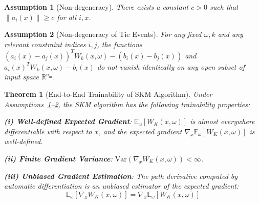 \documentclass[10pt,a4paper]{amsart}
\newtheorem{theorem}{Theorem}
\newtheorem{assumption}{Assumption}
\begin{document}
\begin{assumption}[Non-degeneracy]
\label{assump:nondeg}
There exists a constant $c > 0$ such that $\|a_i(x)\| \geq c$ for all $i,x$.
\end{assumption}

\begin{assumption}[Non-degeneracy of Tie Events]
\label{assump:tie}
For any fixed $\omega, k$ and any relevant constraint indices $i,j$, the functions $(a_i(x) - a_j(x))^T W_k(x,\omega) - (b_i(x) - b_j(x))$ and $a_i(x)^T W_k(x,\omega) - b_i(x)$ do not vanish identically on any open subset of input space $\mathbb{R}^{n_{\text{in}}}$.
\end{assumption}

\begin{theorem}[End-to-End Trainability of SKM Algorithm]
\label{thm:appendix-trainability}
Under Assumptions~\ref{assump:nondeg}--\ref{assump:tie}, the SKM algorithm has the following trainability properties:

\textbf{(i) Well-defined Expected Gradient}: $\mathbb{E}_\omega[W_K(x,\omega)]$ is almost everywhere differentiable with respect to $x$, and the expected gradient $\nabla_x \mathbb{E}_\omega[W_K(x,\omega)]$ is well-defined.

\textbf{(ii) Finite Gradient Variance}: $\text{Var}(\nabla_x W_K(x,\omega)) < \infty$.

\textbf{(iii) Unbiased Gradient Estimation}: The path derivative computed by automatic differentiation is an unbiased estimator of the expected gradient:
$$\mathbb{E}_\omega[\nabla_x W_K(x,\omega)] = \nabla_x \mathbb{E}_\omega[W_K(x,\omega)]$$
\end{theorem}
\end{document}
